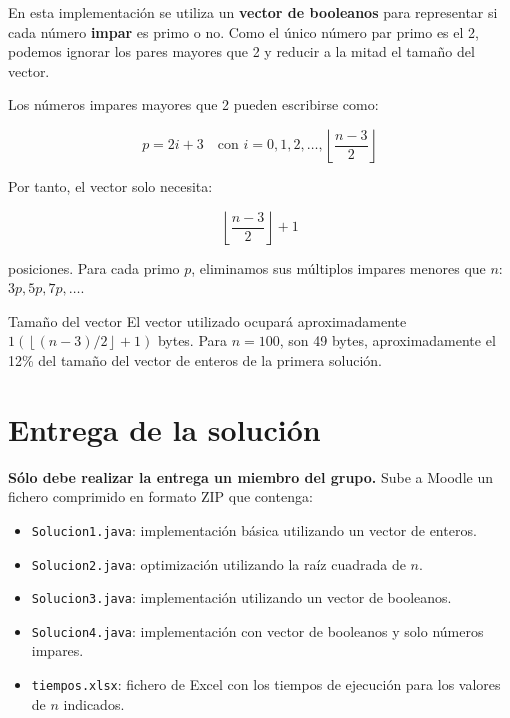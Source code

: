\documentclass[
  spanish,
  11pt,
  a4paper,
  DIV=11,
  numbers=noendperiod]{scrartcl}
\providecommand{\tightlist}{\setlength{\itemsep}{0pt}\setlength{\parskip}{0pt}}
\begin{document}
En esta implementación se utiliza un \textbf{vector de booleanos} para representar si cada número \textbf{impar} es primo o no. Como el único número par primo es el 2, podemos ignorar los pares mayores que 2 y reducir a la mitad el tamaño del vector.

Los números impares mayores que 2 pueden escribirse como:

\[
p = 2i + 3 \quad \text{con } i = 0, 1, 2, \ldots, \left\lfloor\frac{n-3}{2}\right\rfloor
\]

Por tanto, el vector solo necesita:

\[
\left\lfloor\frac{n-3}{2}\right\rfloor + 1
\]

posiciones. Para cada primo \(p\), eliminamos sus múltiplos impares menores que \(n\): \(3p, 5p, 7p,\ldots\).


\begin{PracticeNoteBox}{Tamaño del vector}
El vector utilizado ocupará aproximadamente \(1\left(\left\lfloor(n-3)/2\right\rfloor+1\right)\) bytes. Para \(n=100\), son 49 bytes, aproximadamente el 12\% del tamaño del vector de enteros de la primera solución.
\end{PracticeNoteBox}

\section{Entrega de la solución}\label{entrega-de-la-solucion}

\textbf{Sólo debe realizar la entrega un miembro del grupo.} Sube a Moodle un fichero comprimido en formato ZIP que contenga:

\begin{itemize}
\tightlist
\item \texttt{Solucion1.java}: implementación básica utilizando un vector de enteros.
\item \texttt{Solucion2.java}: optimización utilizando la raíz cuadrada de \(n\).
\item \texttt{Solucion3.java}: implementación utilizando un vector de booleanos.
\item \texttt{Solucion4.java}: implementación con vector de booleanos y solo números impares.
\item \texttt{tiempos.xlsx}: fichero de Excel con los tiempos de ejecución para los valores de \(n\) indicados.
\end{itemize}
\end{document}
